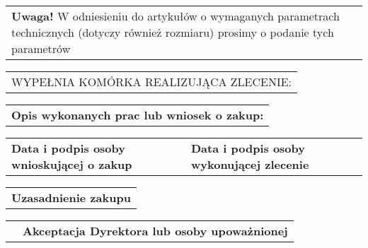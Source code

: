 \documentclass[11pt,a4paper]{article}
\begin{document}
\begin{tabularx}{\linewidth}{|X|}
{\tiny \textbf{Uwaga!} W odniesieniu do artykułów o wymaganych parametrach technicznych (dotyczy również rozmiaru) prosimy o podanie tych parametrów}
\end{tabularx}

\begin{tabularx}{\linewidth}{|X|}
\hline
\rowcolor[gray]{.7}
WYPEŁNIA KOMÓRKA REALIZUJĄCA ZLECENIE:
\end{tabularx}

\begin{tabularx}{\linewidth}{|X|}
\hline
{\footnotesize \textbf{Opis wykonanych prac lub wniosek o zakup:}}\newline


\\
\end{tabularx}

\begin{tabularx}{\linewidth}{|X|X|}
\hline
{\footnotesize \textbf{Data i podpis osoby wnioskującej o zakup}} \newline


&
{\footnotesize \textbf{Data i podpis osoby wykonującej zlecenie}} \newline



\end{tabularx}



\begin{tabularx}{\linewidth}{|X|}
\hline

{\footnotesize \textbf{Uzasadnienie zakupu}}\newline


\end{tabularx}

\begin{tabularx}{\linewidth}{|X X|}

&  
{\footnotesize \textbf{Akceptacja Dyrektora lub osoby upoważnionej}}\newline



\\ 
\end{tabularx}
\end{document}
